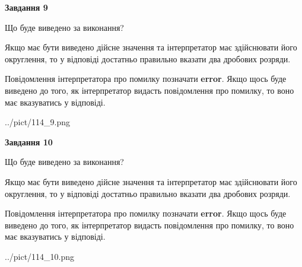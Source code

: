 \documentclass[12pt, ukrainian]{article}
\begin{document}
{\begin {Large}
{\begin {center}\textbf{Завдання 9}\end {center}}\par
Що буде виведено за виконання? \par

Якщо має бути виведено дійсне значення та інтерпретатор має здійснювати його округлення, 
то у відповіді достатньо правильно вказати два дробових розряди.

Повідомлення інтерпретатора про помилку позначати \textbf{error}.
Якщо щось буде виведено до того, як інтерпретатор видасть повідомлення про помилку, 
то воно має вказуватись у відповіді. \par

\begin{center}
	{../pict/114_9.png}
\end{center}
\newpage

{\begin {center}\textbf{Завдання 10}\end {center}}\par
Що буде виведено за виконання? \par

Якщо має бути виведено дійсне значення та інтерпретатор має здійснювати його округлення, 
то у відповіді достатньо правильно вказати два дробових розряди.

Повідомлення інтерпретатора про помилку позначати \textbf{error}.
Якщо щось буде виведено до того, як інтерпретатор видасть повідомлення про помилку, 
то воно має вказуватись у відповіді. \par

\begin{center}
	{../pict/114_10.png}
\end{center}
\newpage

\end {Large}}
\end{document}
